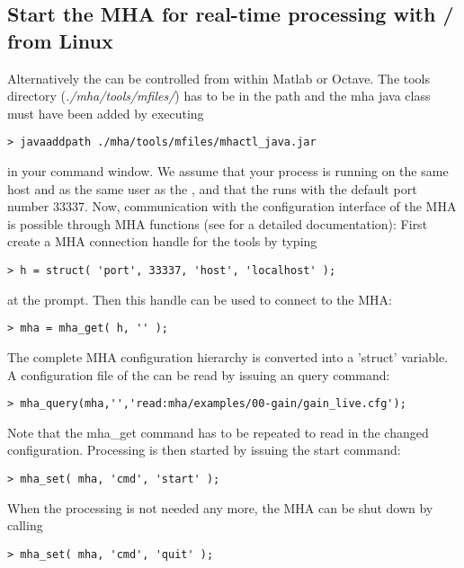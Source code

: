 \subsection{Start the MHA for real-time processing with \Octave{}/\Matlab{} from Linux}%
%
Alternatively the \mhad{} can be controlled from within Matlab or Octave.
%
The \mha{} \Matlab{} tools directory (\emph{./mha/tools/mfiles/}) has to
be in the \Matlab{} path and the mha java class must have been added by executing
\begin{verbatim}
> javaaddpath ./mha/tools/mfiles/mhactl_java.jar
\end{verbatim}
in your \Matlab{} command window.
%
We assume that your \Matlab{} process is running on the same host and
as the same user as the \mha{}, and that the \mhad{} runs with the
default port number 33337.
%
Now, communication with the configuration interface of the MHA is
possible through MHA \Matlab{} functions (see 
for a detailed documentation):
%
First create a MHA connection handle for the \Matlab{} tools by
typing
\begin{verbatim}
> h = struct( 'port', 33337, 'host', 'localhost' );
\end{verbatim}
at the \Matlab{} prompt. Then this handle can be used to connect to
the MHA:
%
\begin{verbatim}
> mha = mha_get( h, '' );
\end{verbatim}
%
The complete MHA configuration hierarchy is converted into a \Matlab{}
'struct' variable.
%
A configuration file of the \mhad{} can be
read by issuing an \mha{} query command:
%
\begin{verbatim}
> mha_query(mha,'','read:mha/examples/00-gain/gain_live.cfg');
\end{verbatim}
%
Note that the mha\_get command has to be repeated to read in the changed configuration.
%
Processing is then started by issuing the start command:
\begin{verbatim}
> mha_set( mha, 'cmd', 'start' );
\end{verbatim}
When the \mha{} processing is not needed any more, the MHA can be shut
down by calling
%
\begin{verbatim}
> mha_set( mha, 'cmd', 'quit' );
\end{verbatim}
